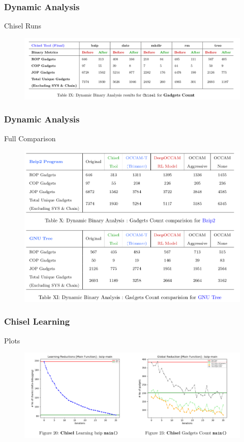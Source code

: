 \documentclass[9pt]{beamer}
\begin{document}
\begin{frame}[fragile]
	\frametitle{Dynamic Analysis}
	\begin{block}{Chisel Runs}
		\begin{figure}[H]
			\centering
			\includegraphics[width=0.8\linewidth]{imgs/dynamic_analysis_1.png}
			\label{fig:plant}
		\end{figure}
	\end{block}
\end{frame}
\begin{frame}[fragile]
	\frametitle{Dynamic Analysis}
	\begin{block}{Full Comparison}
		\begin{figure}[H]
			\centering
			\includegraphics[width=0.8\linewidth]{imgs/dynamic_analysis_2.png}
			\label{fig:plant}
		\end{figure}
	\end{block}
\end{frame}
\begin{frame}[fragile]
	\frametitle{Chisel Learning}
	\begin{block}{Plots}
		\begin{figure}[H]
			\centering
			\includegraphics[width=0.8\linewidth]{imgs/chisel_tool_learning.png}
			\label{fig:plant}
		\end{figure}
	\end{block}
\end{frame}
\end{document}
